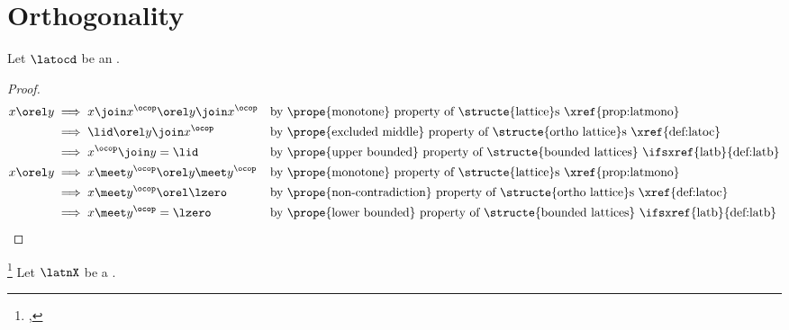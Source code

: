 \section{Orthogonality}
\begin{proposition}
\label{prop:latoc_x_orel_y}
Let $\latocd$ be an  .
\end{proposition}
\begin{proof}
\begin{align*}
  x \orel y
    &\implies x\join x^\ocop \orel y\join x^\ocop
    && \text{by \prope{monotone} property of \structe{lattice}s \xref{prop:latmono}}
  \\&\implies \lid \orel y\join x^\ocop
    && \text{by \prope{excluded middle} property of \structe{ortho lattice}s \xref{def:latoc}}
  \\&\implies x^\ocop\join y = \lid
    && \text{by \prope{upper bounded} property of \structe{bounded lattices} \ifsxref{latb}{def:latb}}
  \\
  x \orel y
    &\implies x\meet y^\ocop \orel y\meet y^\ocop
    && \text{by \prope{monotone} property of \structe{lattice}s \xref{prop:latmono}}
  \\&\implies x\meet y^\ocop \orel \lzero
    && \text{by \prope{non-contradiction} property of \structe{ortho lattice}s \xref{def:latoc}}
  \\&\implies x\meet y^\ocop = \lzero
    && \text{by \prope{lower bounded} property of \structe{bounded lattices} \ifsxref{latb}{def:latb}}
\end{align*}
\end{proof}

\begin{definition}
\footnote{
  ,
  }
\label{def:latoc_orthog}
Let $\latnX$ be a  .
\end{definition}

